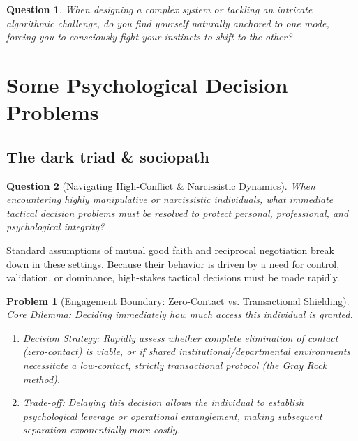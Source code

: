 \documentclass{article}
\newtheorem{problem}{Problem}
\newtheorem{question}{Question}
\begin{document}
\begin{question}
	When designing a complex system or tackling an intricate algorithmic challenge, do you find yourself naturally anchored to one mode, forcing you to consciously fight your instincts to shift to the other?
\end{question}

\section{Some Psychological Decision Problems}

\subsection{The dark triad \& sociopath}

\begin{question}[Navigating High-Conflict \& Narcissistic Dynamics]
	When encountering highly manipulative or narcissistic individuals, what immediate tactical decision problems must be resolved to protect personal, professional, and psychological integrity?
\end{question}

Standard assumptions of mutual good faith and reciprocal negotiation break down in these settings. Because their behavior is driven by a need for control, validation, or dominance, high-stakes tactical decisions must be made rapidly.

\begin{problem}[Engagement Boundary: Zero-Contact vs. Transactional Shielding]
	\emph{Core Dilemma:} Deciding immediately how much access this individual is granted.
	\begin{enumerate}[label=(\roman*)]
		\item \emph{Decision Strategy:} Rapidly assess whether complete elimination of contact (zero-contact) is viable, or if shared institutional/departmental environments necessitate a \textit{low-contact, strictly transactional} protocol (the Gray Rock method).
		\item \emph{Trade-off:} Delaying this decision allows the individual to establish psychological leverage or operational entanglement, making subsequent separation exponentially more costly.
	\end{enumerate}
\end{problem}
\end{document}
